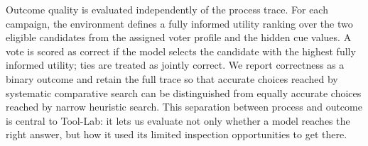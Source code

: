 Outcome quality is evaluated independently of the process trace. For each
campaign, the environment defines a fully informed utility ranking over the two
eligible candidates from the assigned voter profile and the hidden cue values.
A vote is scored as correct if the model selects the candidate with the highest
fully informed utility; ties are treated as jointly correct. We report
correctness as a binary outcome and retain the full trace so that accurate
choices reached by systematic comparative search can be distinguished from
equally accurate choices reached by narrow heuristic search. This separation
between process and outcome is central to Tool-Lab: it lets us evaluate not
only whether a model reaches the right answer, but how it used its limited
inspection opportunities to get there.
